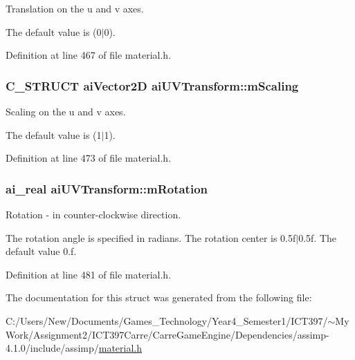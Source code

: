 Translation on the u and v axes.

The default value is (0$|$0). 

Definition at line 467 of file material.h.\hypertarget{structai_u_v_transform_89429a027cbf914e7212e48149a957c8}{
\subsubsection[mScaling]{\setlength{\rightskip}{0pt plus 5cm}C\_\-STRUCT {\bf aiVector2D} {\bf aiUVTransform::mScaling}}}
\label{structai_u_v_transform_89429a027cbf914e7212e48149a957c8}


Scaling on the u and v axes.

The default value is (1$|$1). 

Definition at line 473 of file material.h.\hypertarget{structai_u_v_transform_157005aadfdd145a56c7831c7b24f1ea}{
\subsubsection[mRotation]{\setlength{\rightskip}{0pt plus 5cm}ai\_\-real {\bf aiUVTransform::mRotation}}}
\label{structai_u_v_transform_157005aadfdd145a56c7831c7b24f1ea}


Rotation - in counter-clockwise direction.

The rotation angle is specified in radians. The rotation center is 0.5f$|$0.5f. The default value 0.f. 

Definition at line 481 of file material.h.

The documentation for this struct was generated from the following file:\begin{CompactItemize}
\item 
C:/Users/New/Documents/Games\_\-Technology/Year4\_\-Semester1/ICT397/$\sim$My Work/Assignment2/ICT397Carre/CarreGameEngine/Dependencies/assimp-4.1.0/include/assimp/\hyperlink{material_8h}{material.h}\end{CompactItemize}
